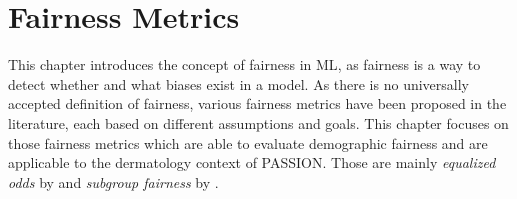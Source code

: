 \documentclass[12pt, a4paper, oneside]{book}   	%
\newcommand{\bolditalic}[1]{\textbf{\textit{{#1}}}}
\begin{document}

			
		\section{Fairness Metrics}
		This chapter introduces the concept of fairness in \gls{ML}, as fairness is a way to detect whether and what biases exist in a model. As there is no universally accepted definition of fairness, various fairness metrics have been proposed in the literature, each based on different assumptions and goals.
		This chapter focuses on those fairness metrics which are able to evaluate demographic fairness and are applicable to the dermatology context of PASSION.	
		Those are mainly \textit{equalized odds} by \textcite{M63_Hardt_2016} and \textit{subgroup fairness} by \textcite{M79_Kearns_2018}.
		
\end{document}
